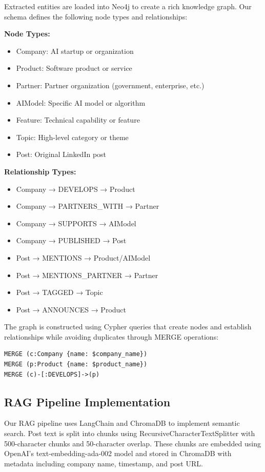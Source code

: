 \documentclass[11pt,twocolumn]{article}
\begin{document}
Extracted entities are loaded into Neo4j to create a rich knowledge graph. Our schema defines the following node types and relationships:

\textbf{Node Types:}
\begin{itemize}
\item Company: AI startup or organization
\item Product: Software product or service
\item Partner: Partner organization (government, enterprise, etc.)
\item AIModel: Specific AI model or algorithm
\item Feature: Technical capability or feature
\item Topic: High-level category or theme
\item Post: Original LinkedIn post
\end{itemize}

\textbf{Relationship Types:}
\begin{itemize}
\item Company → DEVELOPS → Product
\item Company → PARTNERS\_WITH → Partner
\item Company → SUPPORTS → AIModel
\item Company → PUBLISHED → Post
\item Post → MENTIONS → Product/AIModel
\item Post → MENTIONS\_PARTNER → Partner
\item Post → TAGGED → Topic
\item Post → ANNOUNCES → Product
\end{itemize}

The graph is constructed using Cypher queries that create nodes and establish relationships while avoiding duplicates through MERGE operations:

\begin{verbatim}
MERGE (c:Company {name: $company_name})
MERGE (p:Product {name: $product_name})
MERGE (c)-[:DEVELOPS]->(p)
\end{verbatim}

\subsection{RAG Pipeline Implementation}

Our RAG pipeline uses LangChain and ChromaDB to implement semantic search. Post text is split into chunks using RecursiveCharacterTextSplitter with 500-character chunks and 50-character overlap. These chunks are embedded using OpenAI's text-embedding-ada-002 model and stored in ChromaDB with metadata including company name, timestamp, and post URL.
\end{document}
